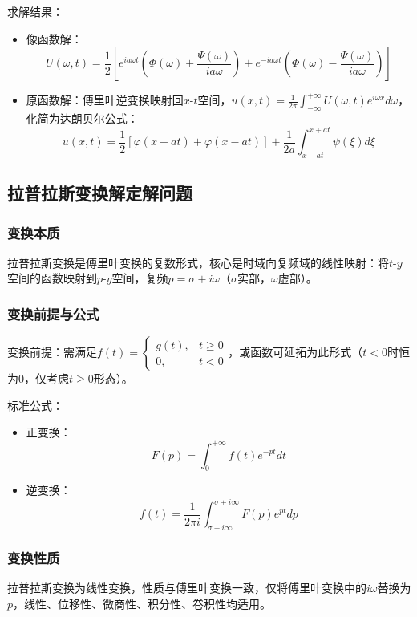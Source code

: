 \documentclass{article}
\begin{document}
	求解结果：
	\begin{itemize}
		\item 像函数解：
		\[
		U(\omega,t) = \frac{1}{2} \left[ e^{ia\omega t} \left( \Phi(\omega) + \frac{\Psi(\omega)}{ia\omega} \right) + e^{-ia\omega t} \left( \Phi(\omega) - \frac{\Psi(\omega)}{ia\omega} \right) \right]
		\]
		\item 原函数解：傅里叶逆变换映射回\(x\text{-}t\)空间，\(u(x,t) = \frac{1}{2\pi} \int_{-\infty}^{+\infty} U(\omega,t) e^{i\omega x} d\omega\)，化简为达朗贝尔公式：
		\[
		u(x,t) = \frac{1}{2}\left[\varphi(x + at)+\varphi(x - at)\right] + \frac{1}{2a}\int_{x - at}^{x + at}\psi(\xi)d\xi
		\]
	\end{itemize}
	
	
	\subsection{拉普拉斯变换解定解问题}
	
	\subsubsection{变换本质}
	拉普拉斯变换是傅里叶变换的复数形式，核心是时域向复频域的线性映射：将\(t\text{-}y\)空间的函数映射到\(p\text{-}y\)空间，复频\(p = \sigma + i\omega\)（\(\sigma\)实部，\(\omega\)虚部）。
	
	\subsubsection{变换前提与公式}
	变换前提：需满足\(f(t)=\begin{cases}g(t), & t\geq0 \\ 0, & t<0\end{cases}\)，或函数可延拓为此形式（\(t<0\)时恒为\(0\)，仅考虑\(t\geq0\)形态）。
	
	标准公式：
	\begin{itemize}
		\item 正变换：
		\[
		F(p) = \int_{0}^{+\infty} f(t) e^{-pt} dt
		\]
		\item 逆变换：
		\[
		f(t) = \frac{1}{2\pi i} \int_{\sigma - i\infty}^{\sigma + i\infty} F(p) e^{pt} dp
		\]
	\end{itemize}
	
	\subsubsection{变换性质}
	拉普拉斯变换为线性变换，性质与傅里叶变换一致，仅将傅里叶变换中的\(i\omega\)替换为\(p\)，线性、位移性、微商性、积分性、卷积性均适用。
	
\end{document}
